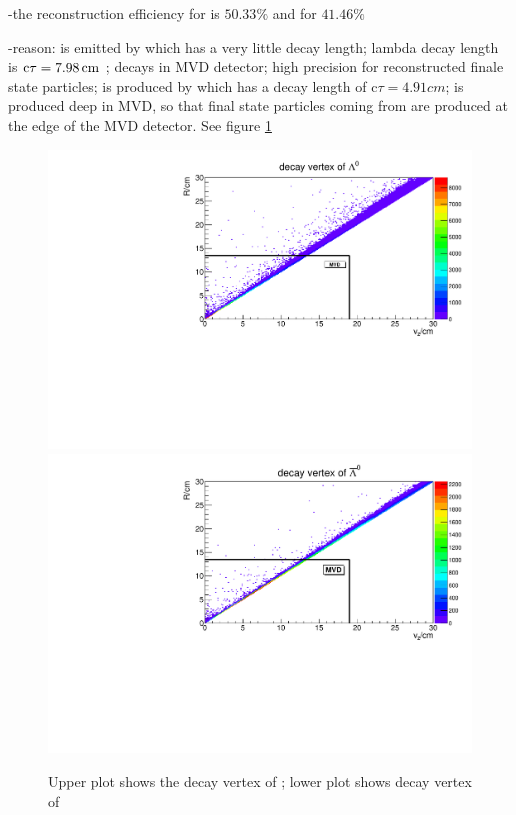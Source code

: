 		-the reconstruction efficiency for \lam is $50.33\%$ and for \alam $41.46\%$ 
		
		-reason: \lam is emitted by \excitedcascade which has a very little decay length; lambda decay length is $\textnormal{c}\tau = 7.98 \, \textnormal{cm}$ \cite{PDG}; 
		\lam decays in MVD detector; high precision for reconstructed finale state particles; \alam is produced by \anticascade which has a decay length of 
		c$\tau = 4.91 \unit{cm}$; \alam is produced deep in MVD, so that final state particles coming from \alam are produced at the edge of the MVD detector.
		See figure \ref{fig:lambda0_antilambda0_decay_vtx}
		
		\begin{figure}
		
			\centering
			\includegraphics[width=1.\textwidth]{./plots/lambda0/lambda0_decay_vtx.pdf}
			\includegraphics[width=1.\textwidth]{./plots/antilambda0/antiLambda0_decay_vtx.pdf}
			\caption{Upper plot shows the decay vertex of \lam; lower plot shows decay vertex of \alam}
			\label{fig:lambda0_antilambda0_decay_vtx}
		
		\end{figure}
		
